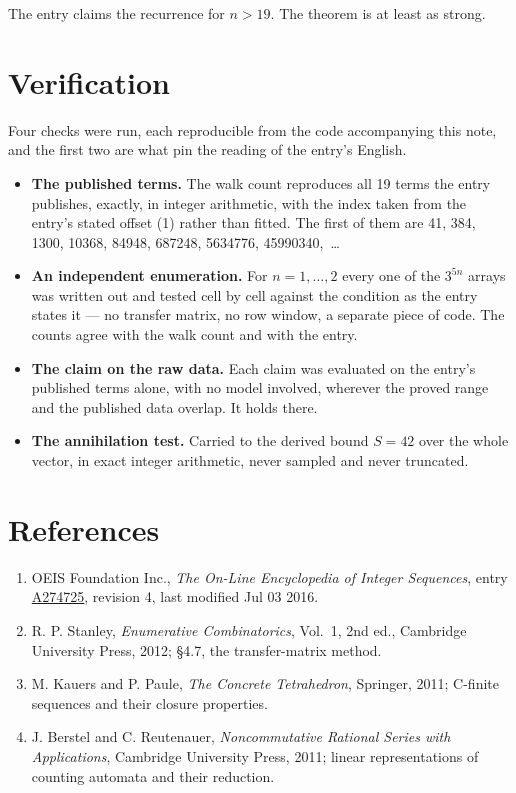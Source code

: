 \documentclass[11pt]{article}
\theoremstyle{definition}
\begin{document}
The entry claims the recurrence for $n > 19$. The theorem is at least as strong.

\section{Verification}

Four checks were run, each reproducible from the code accompanying this note, and the first two are what pin the reading of the entry's English.

\begin{itemize}

\item {\bfseries The published terms.} The walk count reproduces all 19 terms the entry publishes, exactly, in integer arithmetic, with the index taken from the entry's stated offset (1) rather than fitted. The first of them are 41, 384, 1300, 10368, 84948, 687248, 5634776, 45990340,~\dots

\item {\bfseries An independent enumeration.} For $n = 1,\dots,2$ every one of the $3^{5n}$ arrays was written out and tested cell by cell against the condition as the entry states it --- no transfer matrix, no row window, a separate piece of code. The counts agree with the walk count and with the entry.

\item {\bfseries The claim on the raw data.} Each claim was evaluated on the entry's published terms alone, with no model involved, wherever the proved range and the published data overlap. It holds there.

\item {\bfseries The annihilation test.} Carried to the derived bound $S = 42$ over the whole vector, in exact integer arithmetic, never sampled and never truncated.

\end{itemize}

\section{References}

\begin{enumerate}

\item OEIS Foundation Inc., \emph{The On-Line Encyclopedia of Integer Sequences}, entry \href{https://oeis.org/A274725}{A274725}, revision 4, last modified Jul 03 2016.

\item R. P. Stanley, \emph{Enumerative Combinatorics}, Vol.~1, 2nd ed., Cambridge University Press, 2012; \S4.7, the transfer-matrix method.

\item M. Kauers and P. Paule, \emph{The Concrete Tetrahedron}, Springer, 2011; C-finite sequences and their closure properties.

\item J. Berstel and C. Reutenauer, \emph{Noncommutative Rational Series with Applications}, Cambridge University Press, 2011; linear representations of counting automata and their reduction.

\end{enumerate}
\end{document}
